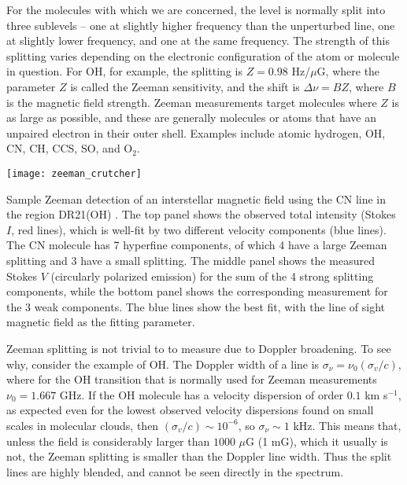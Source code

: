 For the molecules with which we are concerned, the level is normally split into three sublevels -- one at slightly higher frequency than the unperturbed line, one at slightly lower frequency, and one at the same frequency. The strength of this splitting varies depending on the electronic configuration of the atom or molecule in question. For OH, for example, the splitting is $Z=0.98$ Hz/$\mu$G, where the parameter $Z$ is called the Zeeman sensitivity, and the shift is $\Delta \nu = BZ$, where $B$ is the magnetic field strength. Zeeman measurements target molecules where $Z$ is as large as possible, and these are generally molecules or atoms that have an unpaired electron in their outer shell. Examples include atomic hydrogen, OH, CN, CH, CCS, SO, and O$_2$.

\begin{marginfigure}
\texttt{[image: zeeman\_crutcher]}
\caption[Sample Zeeman detection of a magnetic field]{
\label{fig:zeeman}
Sample Zeeman detection of an interstellar magnetic field using the CN line in the region DR21(OH) \citep{crutcher12a}. The top panel shows the observed total intensity (Stokes $I$, red lines), which is well-fit by two different velocity components (blue lines). The CN molecule has 7 hyperfine components, of which 4 have a large Zeeman splitting and 3 have a small splitting. The middle panel shows the measured Stokes $V$ (circularly polarized emission) for the sum of the 4 strong splitting components, while the bottom panel shows the corresponding measurement for the 3 weak components. The blue lines show the best fit, with the line of sight magnetic field as the fitting parameter.
}
\end{marginfigure}
Zeeman splitting is not trivial to to measure due to Doppler broadening. To see why, consider the example of OH. The Doppler width of a line is $\sigma_{\nu} = \nu_0 (\sigma_v/c)$, where for the OH transition that is normally used for Zeeman measurements $\nu_0=1.667$ GHz. If the OH molecule has a velocity dispersion of order $0.1$ km s$^{-1}$, as expected even for the lowest observed velocity dispersions found on small scales in molecular clouds, then $(\sigma_v/c)\sim 10^{-6}$, so $\sigma_{\nu} \sim 1$ kHz. This means that, unless the field is considerably larger than $1000$ $\mu$G (1 mG), which it usually is not, the Zeeman splitting is smaller than the Doppler line width. Thus the split lines are highly blended, and cannot be seen directly in the spectrum.

